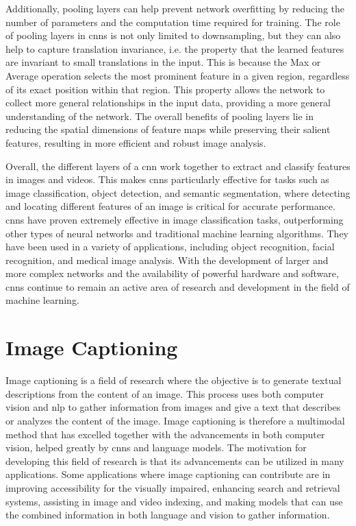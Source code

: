     Additionally, pooling layers can help prevent network overfitting by reducing the number of parameters and the computation time required for training. The role of pooling layers in \glspl{cnn} is not only limited to downsampling, but they can also help to capture translation invariance, i.e. the property that the learned features are invariant to small translations in the input. This is because the Max or Average operation selects the most prominent feature in a given region, regardless of its exact position within that region. This property allows the network to collect more general relationships in the input data, providing a more general understanding of the network. The overall benefits of pooling layers lie in reducing the spatial dimensions of feature maps while preserving their salient features, resulting in more efficient and robust image analysis.
    
    Overall, the different layers of a \gls{cnn} work together to extract and classify features in images and videos. This makes \glspl{cnn} particularly effective for tasks such as image classification, object detection, and semantic segmentation, where detecting and locating different features of an image is critical for accurate performance. \glspl{cnn} have proven extremely effective in image classification tasks, outperforming other types of neural networks and traditional machine learning algorithms. They have been used in a variety of applications, including object recognition, facial recognition, and medical image analysis. With the development of larger and more complex networks and the availability of powerful hardware and software, \glspl{cnn} continue to remain an active area of research and development in the field of machine learning.


\section{Image Captioning}

    Image captioning is a field of research where the objective is to generate textual descriptions from the content of an image. This process uses both computer vision and \gls{nlp} to gather information from images and give a text that describes or analyzes the content of the image. Image captioning is therefore a multimodal method that has excelled together with the advancements in both computer vision, helped greatly by \glspl{cnn} and language models. The motivation for developing this field of research is that its advancements can be utilized in many applications. Some applications where image captioning can contribute are in improving accessibility for the visually impaired, enhancing search and retrieval systems, assisting in image and video indexing, and making models that can use the combined information in both language and vision to gather information. 


